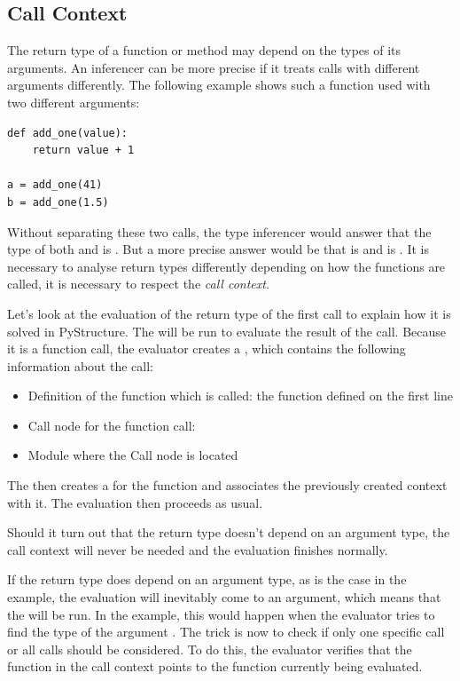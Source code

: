 \documentclass[12pt,halfparskip,DIV11,BCOR10mm]{scrreprt}
\begin{document}
\subsection{Call Context}
\label{call_context}

The return type of a function or method may depend on the types of its arguments. An inferencer can be more precise if it treats calls with different arguments differently. The following example shows such a function used with two different arguments:

\begin{lstlisting}
def add_one(value):
    return value + 1

a = add_one(41)
b = add_one(1.5)
\end{lstlisting}

Without separating these two calls, the type inferencer would answer that the type of both  and  is . But a more precise answer would be that  is  and  is . It is necessary to analyse return types differently depending on how the functions are called, it is necessary to respect the \emph{call context}.

Let's look at the evaluation of the return type of the first  call to explain how it is solved in PyStructure. The  will be run to evaluate the result of the call. Because it is a function call, the evaluator creates a , which contains the following information about the call:

\begin{itemize}
    \item Definition of the function which is called: the  function defined on the first line
    \item Call node for the function call: 
    \item Module where the Call node is located
\end{itemize}

The  then creates a  for the  function and associates the previously created context with it. The evaluation then proceeds as usual.

Should it turn out that the return type doesn't depend on an argument type, the call context will never be needed and the evaluation finishes normally.

If the return type does depend on an argument type, as is the case in the example, the evaluation will inevitably come to an argument, which means that the  will be run. In the example, this would happen when the evaluator tries to find the type of the argument . The trick is now to check if only one specific call or all calls should be considered. To do this, the evaluator verifies that the function in the call context points to the function currently being evaluated.
\end{document}
